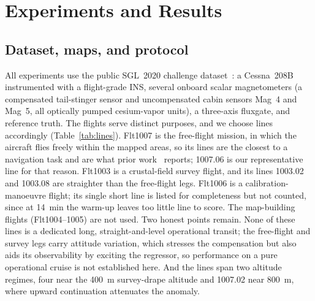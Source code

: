 
\section{Experiments and Results}\label{sec:results}

\subsection{Dataset, maps, and protocol}\label{sec:protocol}
All experiments use the public SGL~2020 challenge dataset~\cite{gnadt2020}: a
Cessna~208B instrumented with a flight-grade INS, several onboard scalar
magnetometers (a compensated tail-stinger sensor and uncompensated cabin sensors
Mag~4 and Mag~5, all optically pumped cesium-vapor units), a three-axis
fluxgate, and reference truth. The flights serve distinct purposes, and we
choose lines accordingly (Table~\ref{tab:lines}). Flt1007 is the free-flight
mission, in which the aircraft flies freely within the mapped areas, so its
lines are the closest to a navigation task and are what prior
work~\cite{gnadt2020,canciani2017,hager2026} reports; 1007.06 is our
representative line for that reason. Flt1003 is a crustal-field survey flight,
and its lines 1003.02 and 1003.08 are straighter than the free-flight legs.
Flt1006 is a calibration-manoeuvre flight; its single short line is listed for
completeness but not counted, since at \SI{14}{\minute} the warm-up leaves too
little line to score. The map-building flights (Flt1004--1005) are not used.
Two honest points remain. None of these lines is a dedicated long,
straight-and-level operational transit; the free-flight and survey legs carry
attitude variation, which stresses the compensation but also aids its
observability by exciting the regressor, so performance on a pure operational
cruise is not established here. And the lines span two altitude regimes, four
near the \SI{400}{\meter} survey-drape altitude and 1007.02 near
\SI{800}{\meter}, where upward continuation attenuates the anomaly.

